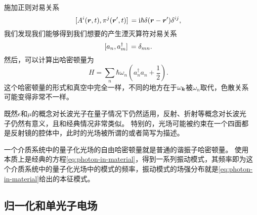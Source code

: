 施加正则对易关系
\begin{equation}
    \comm*{A^i(\vb*{r}, t)}{\pi^j(\vb*{r}', t)} = \ii \hbar \delta(\vb*{r} - \vb*{r}') \delta^{ij},
\end{equation}
我们发现我们能够得到我们想要的产生湮灭算符对易关系
\begin{equation}
    \comm*{a_n}{a_m^\dagger} = \delta_{mn}.
\end{equation}
然后，可以计算出哈密顿量为
\begin{equation}
    H = \sum_n \hbar \omega_n \left( a^\dagger_n a_n + \frac{1}{2} \right).
\end{equation}
这个哈密顿量的形式和真空中完全一样，不同的地方在于$\omega_{\vb*{k}}$被$\omega_n$取代，色散关系可能变得非常不一样。

既然$\epsilon$和$\mu$的概念对长波光子在量子情况下仍然适用，反射、折射等概念对长波光子仍然有意义，且和经典情况非常类似。
特别的，光场可能被约束在一个四面都是反射镜的腔体中，此时的光场被所谓的或者简写为描述。

一个介质系统中的量子化光场的自由哈密顿量就是普通的谐振子哈密顿量。
使用本质上是经典的方程\eqref{eq:photon-in-material}，得到一系列振动模式，其频率即为这个介质系统中的量子化光场中的模式的频率，振动模式的场强分布就是\eqref{eq:photon-in-material}给出的本征模式。

\subsection{归一化和单光子电场}

